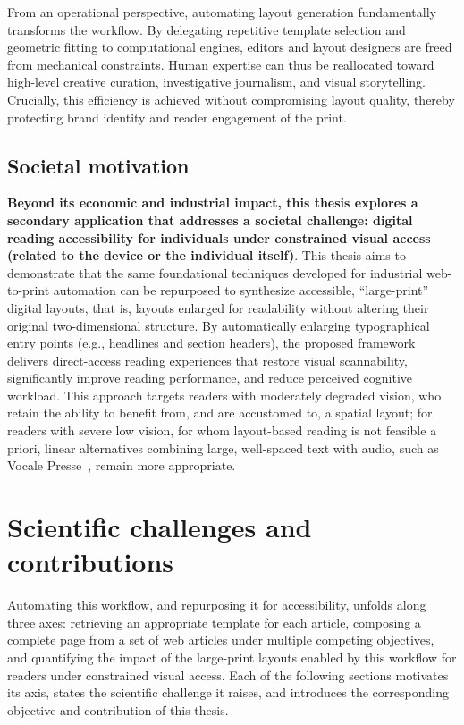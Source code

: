 From an operational perspective, automating layout generation fundamentally transforms the workflow. By delegating repetitive template selection and geometric fitting to computational engines, editors and layout designers are freed from mechanical constraints. Human expertise can thus be reallocated toward high-level creative curation, investigative journalism, and visual storytelling. Crucially, this efficiency is achieved without compromising layout quality, thereby protecting brand identity and reader engagement of the print.

\subsection{Societal motivation}
\label{sec:societal-motivation}


\textbf{Beyond its economic and industrial impact, this thesis explores a secondary application that addresses a societal challenge: digital reading accessibility for individuals under constrained visual access (related to the device or the individual itself)}. This thesis aims to demonstrate that the same foundational techniques developed for industrial web-to-print automation can be repurposed to synthesize accessible, ``large-print'' digital layouts, that is, layouts enlarged for readability without altering their original two-dimensional structure. By automatically enlarging typographical entry points (e.g., headlines and section headers), the proposed framework delivers direct-access reading experiences that restore visual scannability, significantly improve reading performance, and reduce perceived cognitive workload. This approach targets readers with moderately degraded vision, who retain the ability to benefit from, and are accustomed to, a spatial layout; for readers with severe low vision, for whom layout-based reading is not feasible a priori, linear alternatives combining large, well-spaced text with audio, such as Vocale Presse~\cite{vocalepresse}, remain more appropriate.

\section{Scientific challenges and contributions}
\label{sec:scientific-challenges-contributions}

Automating this workflow, and repurposing it for accessibility, unfolds along three axes: retrieving an appropriate template for each article, composing a complete page from a set of web articles under multiple competing objectives, and quantifying the impact of the large-print layouts enabled by this workflow for readers under constrained visual access. Each of the following sections motivates its axis, states the scientific challenge it raises, and introduces the corresponding objective and contribution of this thesis.

